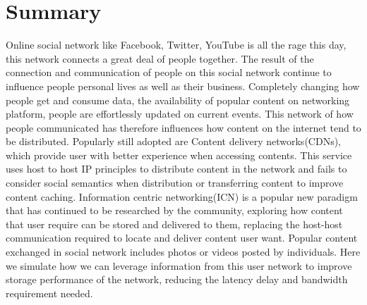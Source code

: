 \section{Summary}

Online social network like Facebook, Twitter, YouTube is all the rage this day, this network connects a great deal of people together. The result of the connection and communication of people on this social network continue to influence people personal lives as well as their business. Completely changing how people get and consume data, the availability of popular content on networking platform, people are effortlessly updated on current events. This network of how people communicated has therefore influences how content on the internet tend to be distributed. Popularly still adopted are Content delivery networks(CDNs), which provide user with better experience when accessing contents.  This service uses host to host IP principles to distribute content in the network and fails to consider social semantics when distribution or transferring content to improve content caching. 
Information centric networking(ICN) is a popular new paradigm that has continued to be researched by the community, exploring how content that user require can be stored and delivered to them, replacing the host-host communication required to locate and deliver content user want. Popular content exchanged in social network includes photos or videos posted by individuals. Here we simulate how we can leverage information from this user network to improve storage performance of the network, reducing the latency delay and bandwidth requirement needed. 























